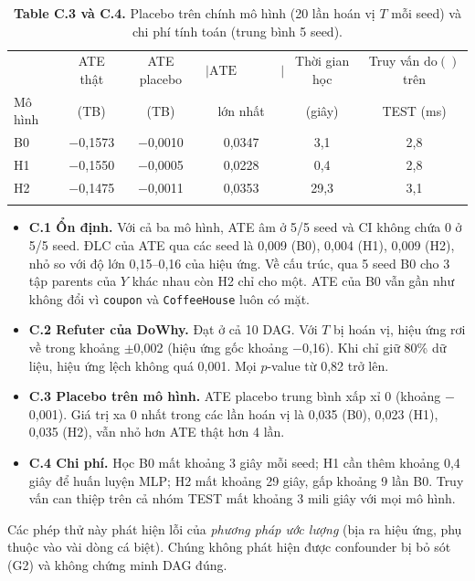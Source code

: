 \documentclass[pdflatex,sn-mathphys-num]{sn-jnl}%
\newcommand{\var}[1]{\texttt{#1}}                 %
\newcommand{\doop}{\mathrm{do}}                   %
\begin{document}
\begin{table}[t]
\caption{\textbf{Table C.3 và C.4.} Placebo trên chính mô hình (20 lần hoán vị $T$ mỗi seed) và chi phí tính toán (trung bình 5 seed).}\label{tab:C3}
\begin{tabular}{@{}lccccc@{}}
\toprule
 & ATE thật & ATE placebo & $|\text{ATE placebo}|$ & Thời gian học & Truy vấn $\doop()$ trên \\
Mô hình & (TB) & (TB) & lớn nhất & (giây) & TEST (ms) \\
\midrule
B0 & $-$0,1573 & $-$0,0010 & 0,0347 & 3,1 & 2,8 \\
H1 & $-$0,1550 & $-$0,0005 & 0,0228 & 0,4 & 2,8 \\
H2 & $-$0,1475 & $-$0,0011 & 0,0353 & 29,3 & 3,1 \\
\botrule
\end{tabular}
\end{table}

\begin{itemize}
\item \textbf{C.1 Ổn định.} Với cả ba mô hình, ATE âm ở 5/5 seed và CI không chứa 0 ở 5/5 seed. ĐLC của ATE qua các seed là 0,009 (B0), 0,004 (H1), 0,009 (H2), nhỏ so với độ lớn 0,15--0,16 của hiệu ứng. Về cấu trúc, qua 5 seed B0 cho 3 tập parents của $Y$ khác nhau còn H2 chỉ cho một. ATE của B0 vẫn gần như không đổi vì \var{coupon} và \var{CoffeeHouse} luôn có mặt.
\item \textbf{C.2 Refuter của DoWhy.} Đạt ở cả 10 DAG. Với $T$ bị hoán vị, hiệu ứng rơi về trong khoảng $\pm$0,002 (hiệu ứng gốc khoảng $-$0,16). Khi chỉ giữ 80\% dữ liệu, hiệu ứng lệch không quá 0,001. Mọi $p$-value từ 0,82 trở lên.
\item \textbf{C.3 Placebo trên mô hình.} ATE placebo trung bình xấp xỉ 0 (khoảng $-$0,001). Giá trị xa 0 nhất trong các lần hoán vị là 0,035 (B0), 0,023 (H1), 0,035 (H2), vẫn nhỏ hơn ATE thật hơn 4 lần.
\item \textbf{C.4 Chi phí.} Học B0 mất khoảng 3 giây mỗi seed; H1 cần thêm khoảng 0,4 giây để huấn luyện MLP; H2 mất khoảng 29 giây, gấp khoảng 9 lần B0. Truy vấn can thiệp trên cả nhóm TEST mất khoảng 3 mili giây với mọi mô hình.
\end{itemize}

Các phép thử này phát hiện lỗi của \emph{phương pháp ước lượng} (bịa ra hiệu ứng, phụ thuộc vào vài dòng cá biệt). Chúng không phát hiện được confounder bị bỏ sót (G2) và không chứng minh DAG đúng.
\end{document}
